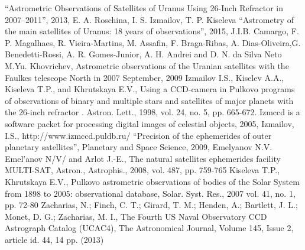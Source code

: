 \documentclass[]{article}
\begin{document}
\begin{thebibliography}{99}
 \textquotedblleft Astrometric Observations of Satellites of Uranus Using 26-Inch Refractor in 2007--2011\textquotedblright, 2013, E. A. Roschina, I. S. Izmailov, T. P. Kiseleva
  \textquotedblleft Astrometry of the main satellites of Uranus: 18 years of observations\textquotedblright, 2015, J.I.B. Camargo, F. P. Magalhaes, R. Vieira-Martins, M. Assafin, F. Braga-Ribas, A. Dias-Oliveira,G. Benedetti-Rossi, A. R. Gomes-Junior, A. H. Andrei and D. N. da Silva Neto
 M.Yu. Khovrichev, Astrometric observations of the Uranian satellites with the Faulkes telescope North in 2007 September, 2009
 Izmailov I.S., Kiselev A.A., Kiseleva T.P., and Khrutskaya E.V., Using a CCD-camera in Pulkovo programs of observations of binary and multiple stars and satellites of major planets with the 26-inch refractor . Astron. Lett., 1998, vol. 24, no. 5, pp. 665-672.
  Izmccd is a software  packet for processing digital images of celestial objects, 2005, Izmailov, I.S., http://www.izmccd.puldb.ru/
 \textquotedblleft Precision of the ephemerides of outer planetary satellites\textquotedblright, Planetary and Space Science, 2009, Emelyanov N.V.
 Emel'anov N/V/ and Arlot J.-E., The natural satellites ephemerides facility MULTI-SAT, Astron., Astrophis., 2008, vol. 487, pp. 759-765
 Kiseleva T.P., Khrutskaya E.V., Pulkovo astrometric observations of bodies of the Solar System from 1898 to 2005: observational database, Solar. Syst. Res., 2007 vol. 41, no. 1, pp. 72-80
 Zacharias, N.; Finch, C. T.; Girard, T. M.; Henden, A.; Bartlett, J. L.; Monet, D. G.; Zacharias, M. I., The Fourth US Naval Observatory CCD Astrograph Catalog (UCAC4), The Astronomical Journal, Volume 145, Issue 2, article id. 44, 14 pp. (2013)
\end{thebibliography}
\end{document}
